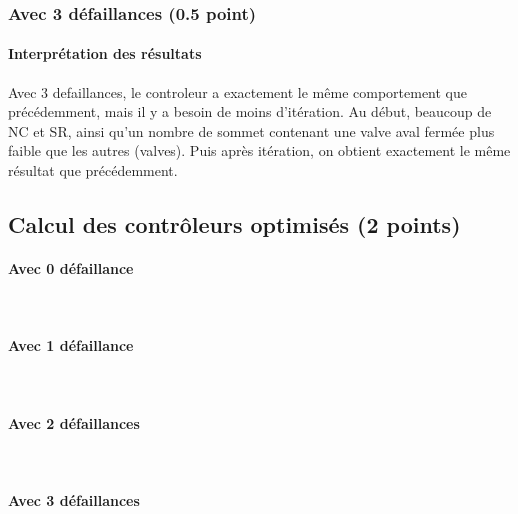 \documentclass[a4paper]{book}
\begin{document}
\subsubsection{Avec 3 défaillances (0.5 point)}




%
\paragraph{Interprétation des résultats}
Avec 3 defaillances, le controleur a exactement le même comportement que précédemment, mais il y a besoin de moins d'itération. 
Au début, beaucoup de NC et SR, ainsi qu'un nombre de sommet contenant une valve aval fermée plus faible que les autres (valves).
Puis après itération, on obtient exactement le même résultat que précédemment.

\subsection{Calcul des contrôleurs optimisés (2 points)}
\paragraph{Avec 0 défaillance}\ \\


\paragraph{Avec 1 défaillance}\ \\


\paragraph{Avec 2 défaillances}\ \\


\paragraph{Avec 3 défaillances}\ \\

\end{document}

